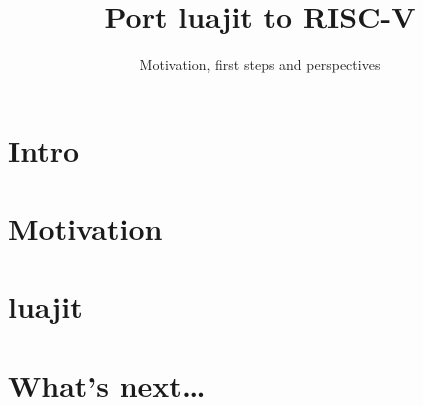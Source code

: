 
\usepackage{tikz}

\title{Port luajit to RISC-V}
\subtitle{Motivation, first steps and perspectives}




\begin{frame}
  \titlepage
\end{frame}

\frame{\tableofcontents[subsectionstyle=show]}

\section{Intro}

\begin{frame}
\end{frame}

\section{Motivation}

\begin{frame}
\end{frame}

\section{luajit}

\section{What's next\dots}



